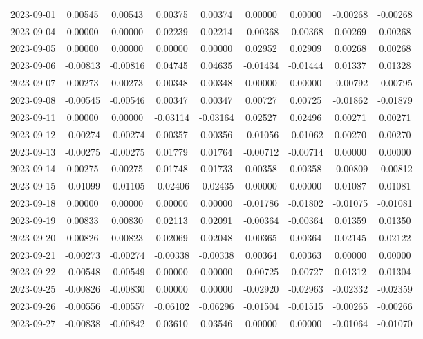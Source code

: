 {\begin{footnotesize}
\begin{longtable}{lcccccccc}
2023-09-01 & 0.00545 & 0.00543 & 0.00375 & 0.00374 & 0.00000 & 0.00000 & -0.00268 & -0.00268 \\
2023-09-04 & 0.00000 & 0.00000 & 0.02239 & 0.02214 & -0.00368 & -0.00368 & 0.00269 & 0.00268 \\
2023-09-05 & 0.00000 & 0.00000 & 0.00000 & 0.00000 & 0.02952 & 0.02909 & 0.00268 & 0.00268 \\
2023-09-06 & -0.00813 & -0.00816 & 0.04745 & 0.04635 & -0.01434 & -0.01444 & 0.01337 & 0.01328 \\
2023-09-07 & 0.00273 & 0.00273 & 0.00348 & 0.00348 & 0.00000 & 0.00000 & -0.00792 & -0.00795 \\
2023-09-08 & -0.00545 & -0.00546 & 0.00347 & 0.00347 & 0.00727 & 0.00725 & -0.01862 & -0.01879 \\
2023-09-11 & 0.00000 & 0.00000 & -0.03114 & -0.03164 & 0.02527 & 0.02496 & 0.00271 & 0.00271 \\
2023-09-12 & -0.00274 & -0.00274 & 0.00357 & 0.00356 & -0.01056 & -0.01062 & 0.00270 & 0.00270 \\
2023-09-13 & -0.00275 & -0.00275 & 0.01779 & 0.01764 & -0.00712 & -0.00714 & 0.00000 & 0.00000 \\
2023-09-14 & 0.00275 & 0.00275 & 0.01748 & 0.01733 & 0.00358 & 0.00358 & -0.00809 & -0.00812 \\
2023-09-15 & -0.01099 & -0.01105 & -0.02406 & -0.02435 & 0.00000 & 0.00000 & 0.01087 & 0.01081 \\
2023-09-18 & 0.00000 & 0.00000 & 0.00000 & 0.00000 & -0.01786 & -0.01802 & -0.01075 & -0.01081 \\
2023-09-19 & 0.00833 & 0.00830 & 0.02113 & 0.02091 & -0.00364 & -0.00364 & 0.01359 & 0.01350 \\
2023-09-20 & 0.00826 & 0.00823 & 0.02069 & 0.02048 & 0.00365 & 0.00364 & 0.02145 & 0.02122 \\
2023-09-21 & -0.00273 & -0.00274 & -0.00338 & -0.00338 & 0.00364 & 0.00363 & 0.00000 & 0.00000 \\
2023-09-22 & -0.00548 & -0.00549 & 0.00000 & 0.00000 & -0.00725 & -0.00727 & 0.01312 & 0.01304 \\
2023-09-25 & -0.00826 & -0.00830 & 0.00000 & 0.00000 & -0.02920 & -0.02963 & -0.02332 & -0.02359 \\
2023-09-26 & -0.00556 & -0.00557 & -0.06102 & -0.06296 & -0.01504 & -0.01515 & -0.00265 & -0.00266 \\
2023-09-27 & -0.00838 & -0.00842 & 0.03610 & 0.03546 & 0.00000 & 0.00000 & -0.01064 & -0.01070 \\

\end{longtable}
\end{footnotesize}}
